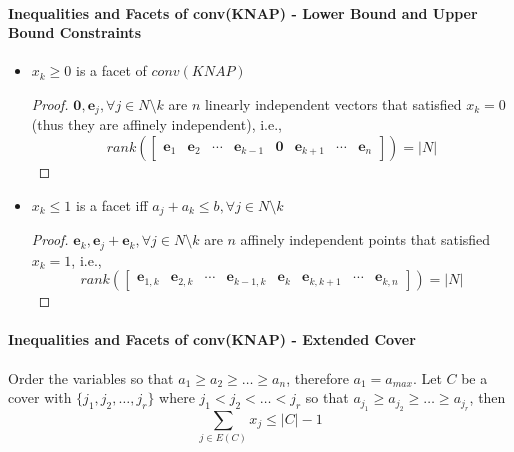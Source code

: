                 \paragraph{Inequalities and Facets of conv(KNAP) - Lower Bound and Upper Bound Constraints}
                    \begin{itemize}
                        \item $x_k\ge 0$ is a facet of $conv(KNAP)$
                            \begin{proof}
                                $\mathbf{0}, \mathbf{e}_j, \forall j\in N\setminus k$ are $n$ linearly independent vectors that satisfied $x_k = 0$ (thus they are affinely independent), i.e.,
                                \begin{equation*}
                                    rank(\begin{bmatrix}
                                        \textbf{e}_1 & \textbf{e}_2 & \cdots & \textbf{e}_{k - 1} & \textbf{0} & \textbf{e}_{k + 1} & \cdots & \textbf{e}_n
                                    \end{bmatrix}) = |N|
                                \end{equation*}
                            \end{proof}

                        \item $x_k\le 1$ is a facet iff $a_j + a_k \le b, \forall j\in N \setminus k$
                            \begin{proof}
                                $\textbf{e}_k, \textbf{e}_j+\textbf{e}_k, \forall j \in N\setminus k$ are $n$ affinely independent points that satisfied $x_k = 1$, i.e.,
                                \begin{equation*}
                                    rank(\begin{bmatrix}
                                        \mathbf{e}_{1, k} & \mathbf{e}_{2, k} & \cdots & \mathbf{e}_{k - 1, k} & \mathbf{e}_k & \mathbf{e}_{k, k + 1} & \cdots & \mathbf{e}_{k, n}
                                    \end{bmatrix}) = |N|
                                \end{equation*}
                            \end{proof}
                    \end{itemize}                

                \paragraph{Inequalities and Facets of conv(KNAP) - Extended Cover}
                    Order the variables so that $a_1 \ge a_2 \ge \dots \ge a_n$, therefore $a_1 = a_{max}$. Let $C$ be a cover with $\{j_1, j_2, \dots, j_r\}$ where $j_1 < j_2 < \dots < j_r$ so that $a_{j_1} \ge a_{j_2} \ge \dots \ge a_{j_r}$, then
                    \begin{equation*}
                        \sum_{j\in E(C)} x_j \le |C| - 1 
                    \end{equation*}


